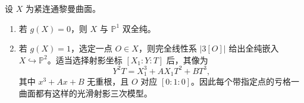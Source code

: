 \begin{theorem}\label{g4:thm:0305:low-genus}
	设 \(X\) 为紧连通黎曼曲面。
	\begin{enumerate}
		\item 若 \(g(X)=0\)，则 \(X\) 与 \(\mathbb P^1\) 双全纯。
		\item 若 \(g(X)=1\)，选定一点 \(O\in X\)，则完全线性系 \(|3[O]|\) 给出全纯嵌入 \(X\hookrightarrow\mathbb P^2\)。适当选择射影坐标 \([X_1:Y:T]\) 后，其像为
		\begin{equation}\label{g4:eq:0305:weierstrass-cubic}
			Y^2T=X_1^3+A X_1T^2+B T^3,
		\end{equation}
		其中 \(x^3+Ax+B\) 无重根，且 \(O\) 对应 \([0:1:0]\)。因此每个带指定点的亏格一曲面都有这样的光滑射影三次模型。
	\end{enumerate}
\end{theorem}
